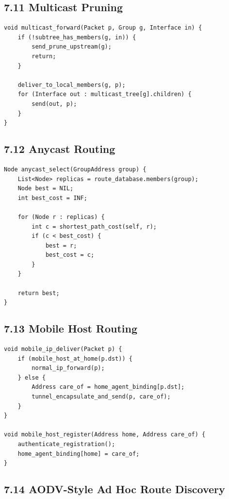 \documentclass[11pt]{article}
\begin{document}
\subsection{7.11 Multicast Pruning}\label{multicast-pruning}

\begin{verbatim}
void multicast_forward(Packet p, Group g, Interface in) {
    if (!subtree_has_members(g, in)) {
        send_prune_upstream(g);
        return;
    }

    deliver_to_local_members(g, p);
    for (Interface out : multicast_tree[g].children) {
        send(out, p);
    }
}
\end{verbatim}

\subsection{7.12 Anycast Routing}\label{anycast-routing}

\begin{verbatim}
Node anycast_select(GroupAddress group) {
    List<Node> replicas = route_database.members(group);
    Node best = NIL;
    int best_cost = INF;

    for (Node r : replicas) {
        int c = shortest_path_cost(self, r);
        if (c < best_cost) {
            best = r;
            best_cost = c;
        }
    }

    return best;
}
\end{verbatim}

\subsection{7.13 Mobile Host Routing}\label{mobile-host-routing}

\begin{verbatim}
void mobile_ip_deliver(Packet p) {
    if (mobile_host_at_home(p.dst)) {
        normal_ip_forward(p);
    } else {
        Address care_of = home_agent_binding[p.dst];
        tunnel_encapsulate_and_send(p, care_of);
    }
}

void mobile_host_register(Address home, Address care_of) {
    authenticate_registration();
    home_agent_binding[home] = care_of;
}
\end{verbatim}

\subsection{7.14 AODV-Style Ad Hoc Route
Discovery}\label{aodv-style-ad-hoc-route-discovery}
\end{document}
